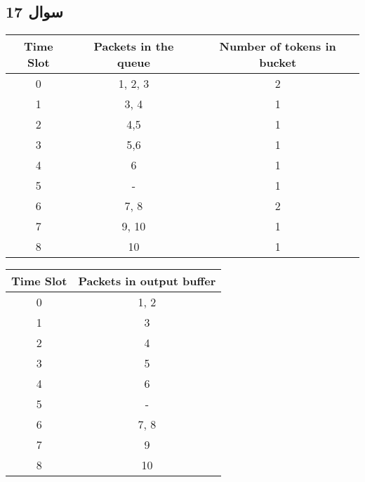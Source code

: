 \documentclass{article}
\begin{document}
\subsection{سوال 17}
\begin{latin}
\begin{table}[H]
\begin{tabular}{|c|c|c|}
\hline
\textbf{Time Slot} & \textbf{Packets in the queue} & \textbf{Number of tokens in bucket} \\ \hline
0                  & 1, 2, 3                       & 2                                   \\ \hline
1                  & 3, 4                          & 1                                   \\ \hline
2                  & 4,5                           & 1                                   \\ \hline
3                  & 5,6                           & 1                                   \\ \hline
4                  & 6                             & 1                                   \\ \hline
5                  & -                             & 1                                   \\ \hline
6                  & 7, 8                          & 2                                   \\ \hline
7                  & 9, 10                         & 1                                   \\ \hline
8                  & 10                            & 1                                   \\ \hline
\end{tabular}
\end{table}

\begin{table}[H]
\begin{tabular}{|c|c|}
\hline
\textbf{Time Slot} & \textbf{Packets in output buffer} \\ \hline
0                  & 1, 2                              \\ \hline
1                  & 3                                 \\ \hline
2                  & 4                                 \\ \hline
3                  & 5                                 \\ \hline
4                  & 6                                 \\ \hline
5                  & -                                 \\ \hline
6                  & 7, 8                              \\ \hline
7                  & 9                                 \\ \hline
8                  & 10                                \\ \hline
\end{tabular}
\end{table}


\end{latin}
\end{document}

